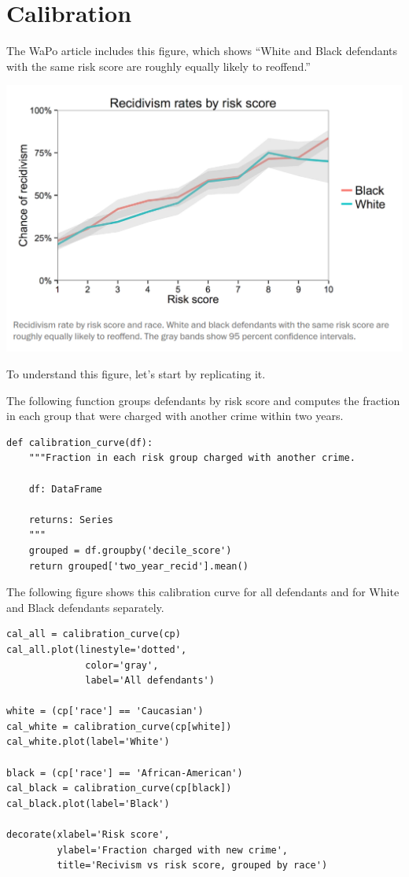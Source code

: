 \hypertarget{calibration}{%
\section{Calibration}\label{calibration}}

The WaPo article includes this figure, which shows ``White and Black
defendants with the same risk score are roughly equally likely to
reoffend.''

\includegraphics{chapters/figs/calibration1.png}

To understand this figure, let's start by replicating it.

The following function groups defendants by risk score and computes the
fraction in each group that were charged with another crime within two
years.

\begin{lstlisting}[]
def calibration_curve(df):
    """Fraction in each risk group charged with another crime.
    
    df: DataFrame
    
    returns: Series
    """
    grouped = df.groupby('decile_score')
    return grouped['two_year_recid'].mean()
\end{lstlisting}

The following figure shows this calibration curve for all defendants and
for White and Black defendants separately.

\begin{lstlisting}[]
cal_all = calibration_curve(cp)
cal_all.plot(linestyle='dotted', 
              color='gray',
              label='All defendants')

white = (cp['race'] == 'Caucasian')
cal_white = calibration_curve(cp[white])
cal_white.plot(label='White')

black = (cp['race'] == 'African-American')
cal_black = calibration_curve(cp[black])
cal_black.plot(label='Black')

decorate(xlabel='Risk score',
         ylabel='Fraction charged with new crime',
         title='Recivism vs risk score, grouped by race')
\end{lstlisting}

